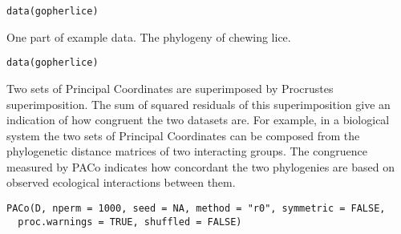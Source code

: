 \documentclass[letterpaper]{book}
\begin{document}
%
\begin{Usage}
\begin{verbatim}
data(gopherlice)
\end{verbatim}
\end{Usage}
%
\begin{Description}\relax
One part of example data. The phylogeny of chewing lice.
\end{Description}
%
\begin{Usage}
\begin{verbatim}
data(gopherlice)
\end{verbatim}
\end{Usage}
%
\begin{Description}\relax
Two sets of Principal Coordinates are superimposed by Procrustes superimposition. The sum of squared residuals of this superimposition give an indication of how congruent the two datasets are. For example, in a biological system the two sets of Principal Coordinates can be composed from the phylogenetic distance matrices of two interacting groups. The congruence measured by PACo indicates how concordant the two phylogenies are based on observed ecological interactions between them.
\end{Description}
%
\begin{Usage}
\begin{verbatim}
PACo(D, nperm = 1000, seed = NA, method = "r0", symmetric = FALSE,
  proc.warnings = TRUE, shuffled = FALSE)
\end{verbatim}
\end{Usage}
%
\end{document}
